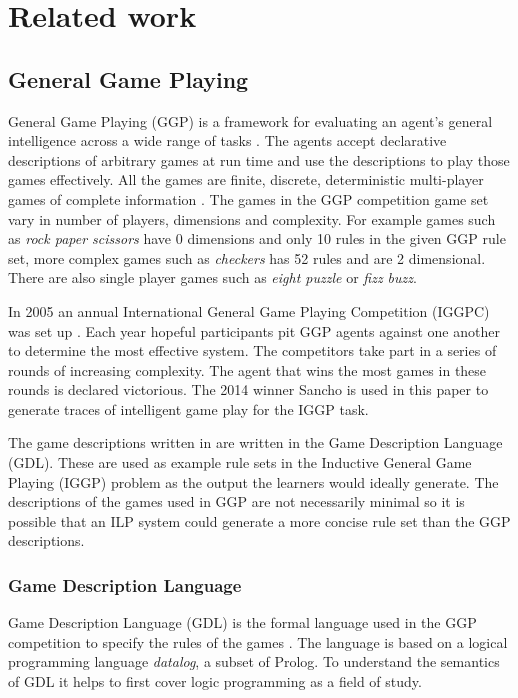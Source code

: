 \chapter{Related work}

\section{General Game Playing}

General Game Playing (GGP) is a framework for evaluating an agent's general intelligence across a wide range of tasks \cite{Cropper/IGGP,Genesereth/GGPOverview}. The agents accept declarative descriptions of arbitrary games at run time and use the descriptions to play those games effectively. All the games are finite, discrete, deterministic multi-player games of complete information \cite{GDL_Spec}. The games in the GGP competition game set vary in number of players, dimensions and complexity. For example games such as \textit{rock paper scissors} have 0 dimensions and only 10 rules in the given GGP rule set, more complex games such as \textit{checkers} has 52 rules and are 2 dimensional. There are also single player games such as \textit{eight puzzle} or \textit{fizz buzz}.

In 2005 an annual International General Game Playing Competition (IGGPC) was set up \cite{Kowalski/GGP}. Each year hopeful participants pit GGP agents against one another to determine the most effective system. The competitors take part in a series of rounds of increasing complexity. The agent that wins the most games in these rounds is declared victorious. The 2014 winner Sancho is used in this paper to generate traces of intelligent game play for the IGGP task.

The game descriptions written in are written in the Game Description Language (GDL). These are used as example rule sets  in the Inductive General Game Playing (IGGP) problem as the output the learners would ideally generate. The descriptions of the games used in GGP are not necessarily minimal so it is possible that an ILP system could generate a more concise rule set than the GGP descriptions.

\subsection{Game Description Language}\label{sec:GDL}
Game Description Language (GDL) is the formal language used in the GGP competition to specify the rules of the games \cite{GDL_Spec}. The language is based on a logical programming language \textit{datalog}, a subset of Prolog. To understand the semantics of GDL it helps to first cover logic programming as a field of study.
